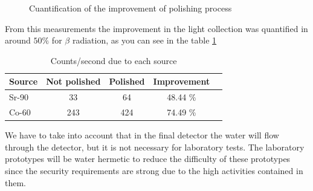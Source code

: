 \begin{figure}[htbp]
\centering
{}
\caption{Cuantification of the improvement of polishing process} \label{fig:ResultPolish}
\end{figure}

From this measurements the improvement in the light collection was quantified in around $50\%$ for $\beta$ radiation, as you can see in the table \ref{TablePolish}

\begin{table}
\centering
\begin{tabular}{l | c | c | c | c}
Source & Not polished & Polished & Improvement\\
\hline \hline
Sr-90 & 33 & 64  & 48.44 \% \\ 
Co-60 & 243 & 424 & 74.49 \% 
\end{tabular}
\caption{Counts/second due to each source \label{TablePolish}}
\end{table}

We have to take into account that in the final detector the water will flow through the detector, but it is not necessary for laboratory tests. The laboratory prototypes will be water hermetic to reduce the difficulty of these prototypes since the security requirements are strong due to the high activities contained in them.

